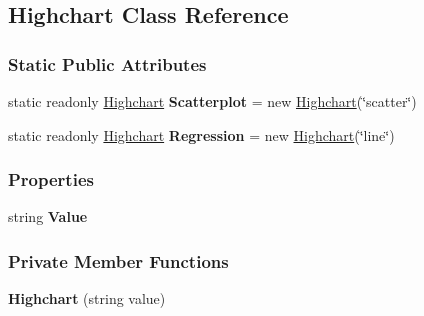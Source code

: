 \hypertarget{classHighcharts_1_1Highchart}{}\subsection{Highchart Class Reference}
\label{classHighcharts_1_1Highchart}
\subsubsection*{Static Public Attributes}
\begin{DoxyCompactItemize}
\item 
\mbox{\label{classHighcharts_1_1Highchart_a152d250f31b12e9713ed04fd672c95a8}} 
static readonly \hyperlink{classHighcharts_1_1Highchart}{Highchart} {\bfseries Scatterplot} = new \hyperlink{classHighcharts_1_1Highchart}{Highchart}(\char`\"{}scatter\char`\"{})
\item 
\mbox{\label{classHighcharts_1_1Highchart_a9ec66595aaa01595731452d18ed8a402}} 
static readonly \hyperlink{classHighcharts_1_1Highchart}{Highchart} {\bfseries Regression} = new \hyperlink{classHighcharts_1_1Highchart}{Highchart}(\char`\"{}line\char`\"{})
\end{DoxyCompactItemize}
\subsubsection*{Properties}
\begin{DoxyCompactItemize}
\item 
\mbox{\label{classHighcharts_1_1Highchart_af7b88db799d8f791f785e437bc6099d2}} 
string {\bfseries Value}
\end{DoxyCompactItemize}
\subsubsection*{Private Member Functions}
\begin{DoxyCompactItemize}
\item 
\mbox{\label{classHighcharts_1_1Highchart_a15fc3de64317e04fa3642ed4bf0b2797}} 
{\bfseries Highchart} (string value)
\end{DoxyCompactItemize}
